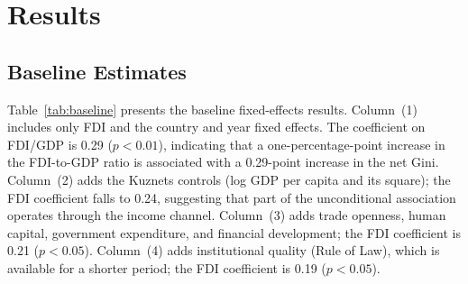 \documentclass[12pt,a4paper]{article}
\begin{document}
\section{Results}\label{sec:results}

\subsection{Baseline Estimates}

Table~\ref{tab:baseline} presents the baseline fixed-effects results.  Column~(1) includes only FDI and the country and year fixed effects.  The coefficient on FDI/GDP is 0.29 ($p < 0.01$), indicating that a one-percentage-point increase in the FDI-to-GDP ratio is associated with a 0.29-point increase in the net Gini.  Column~(2) adds the Kuznets controls (log GDP per capita and its square); the FDI coefficient falls to 0.24, suggesting that part of the unconditional association operates through the income channel.  Column~(3) adds trade openness, human capital, government expenditure, and financial development; the FDI coefficient is 0.21 ($p < 0.05$).  Column~(4) adds institutional quality (Rule of Law), which is available for a shorter period; the FDI coefficient is 0.19 ($p < 0.05$).
\end{document}
